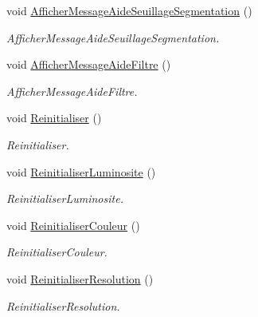 \begin{DoxyCompactItemize}
void \hyperlink{classAppMainWindow_a7e13b2d80dad8ff3aec33ccb26b02c7c}{Afficher\+Message\+Aide\+Seuillage\+Segmentation} ()
\begin{DoxyCompactList}\small\item\em Afficher\+Message\+Aide\+Seuillage\+Segmentation. \end{DoxyCompactList}\item 
\mbox{\label{classAppMainWindow_ac8c1ab080428c14e0c3a5b24ff2fafda}} 
void \hyperlink{classAppMainWindow_ac8c1ab080428c14e0c3a5b24ff2fafda}{Afficher\+Message\+Aide\+Filtre} ()
\begin{DoxyCompactList}\small\item\em Afficher\+Message\+Aide\+Filtre. \end{DoxyCompactList}\item 
\mbox{\label{classAppMainWindow_a9042c19494f15429b5aad9bbe59ba023}} 
void \hyperlink{classAppMainWindow_a9042c19494f15429b5aad9bbe59ba023}{Reinitialiser} ()
\begin{DoxyCompactList}\small\item\em Reinitialiser. \end{DoxyCompactList}\item 
\mbox{\label{classAppMainWindow_a91ffecb9b2acbe9e1f916877eb296186}} 
void \hyperlink{classAppMainWindow_a91ffecb9b2acbe9e1f916877eb296186}{Reinitialiser\+Luminosite} ()
\begin{DoxyCompactList}\small\item\em Reinitialiser\+Luminosite. \end{DoxyCompactList}\item 
\mbox{\label{classAppMainWindow_a3b01e5bdb7c4501fde5d62a64f640f55}} 
void \hyperlink{classAppMainWindow_a3b01e5bdb7c4501fde5d62a64f640f55}{Reinitialiser\+Couleur} ()
\begin{DoxyCompactList}\small\item\em Reinitialiser\+Couleur. \end{DoxyCompactList}\item 
\mbox{\label{classAppMainWindow_aadfbd328b2abcc69c700bd09f5f38a87}} 
void \hyperlink{classAppMainWindow_aadfbd328b2abcc69c700bd09f5f38a87}{Reinitialiser\+Resolution} ()
\begin{DoxyCompactList}\small\item\em Reinitialiser\+Resolution. \end{DoxyCompactList}\item 

\end{DoxyCompactItemize}
